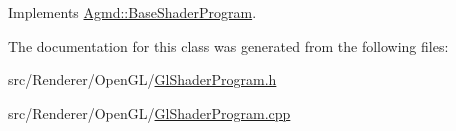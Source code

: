 Implements \hyperlink{class_agmd_1_1_base_shader_program_a012143de4494c70afabb7a0eca867cd9}{Agmd\+::\+Base\+Shader\+Program}.



The documentation for this class was generated from the following files\+:\begin{DoxyCompactItemize}
\item 
src/\+Renderer/\+Open\+G\+L/\hyperlink{_gl_shader_program_8h}{Gl\+Shader\+Program.\+h}\item 
src/\+Renderer/\+Open\+G\+L/\hyperlink{_gl_shader_program_8cpp}{Gl\+Shader\+Program.\+cpp}\end{DoxyCompactItemize}
